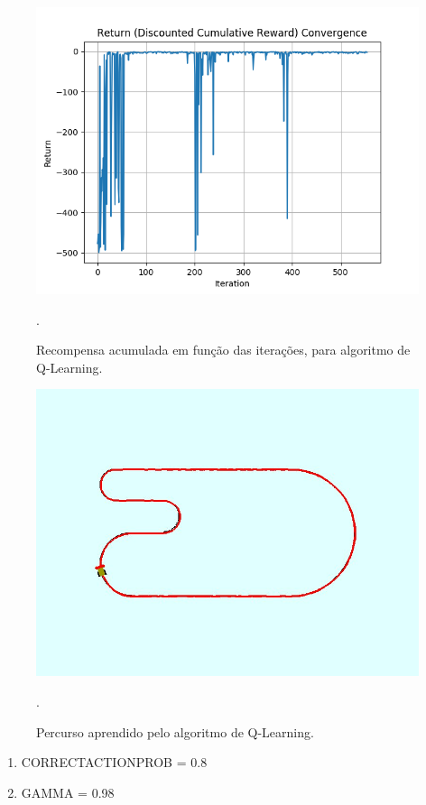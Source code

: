 \documentclass[conference]{IEEEtran}
\begin{document}
\begin{figure}[htbp]
\centering
\centerline{\includegraphics[scale=0.5]{imagens/q-learning/return_convergence.png}}
\caption{Recompensa acumulada em função das iterações, para algoritmo de Q-Learning.}.
\label{q-learning/return_convergence}
\end{figure}

\begin{figure}[htbp]
\centering
\centerline{\includegraphics[scale=0.25]{imagens/q-learning/line_follower_solution.jpeg}}
\caption{Percurso aprendido pelo algoritmo de Q-Learning.}.
\label{q-learning/line_follower_solution}
\end{figure}

\begin{enumerate}
\item CORRECT\underline{\space}ACTION\underline{\space}PROB = 0.8

\item GAMMA = 0.98
\end{enumerate}
\end{document}
